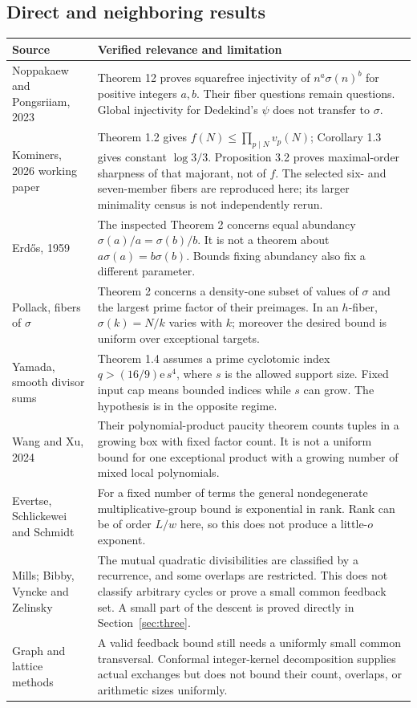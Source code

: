 \documentclass[11pt,a4paper]{article}
\theoremstyle{remark}
\begin{document}
\subsection{Direct and neighboring results}
\begin{longtable}{@{}P{.25\textwidth}P{.69\textwidth}@{}}
\toprule
Source & Verified relevance and limitation\\
\midrule\endhead
Noppakaew and Pongsriiam, 2023 \cite{np} &
Theorem 12 proves squarefree injectivity of $n^a\sigma(n)^b$ for positive
integers $a,b$. Their fiber questions remain questions. Global injectivity for
Dedekind's $\psi$ does not transfer to $\sigma$.\\[4pt]
Kominers, 2026 working paper \cite{kominers} &
Theorem 1.2 gives $f(N)\le\prod_{p\mid N}v_p(N)$; Corollary 1.3 gives
constant $\log3/3$. Proposition 3.2 proves maximal-order sharpness of that
majorant, not of $f$. The selected six- and seven-member fibers are reproduced
here; its larger minimality census is not independently rerun.\\[4pt]
Erd\H{o}s, 1959 \cite{erdos} &
The inspected Theorem 2 concerns equal abundancy
$\sigma(a)/a=\sigma(b)/b$. It is not a theorem about $a\sigma(a)=b\sigma(b)$.
Bounds fixing abundancy also fix a different parameter.\\[4pt]
Pollack, fibers of $\sigma$ \cite{pollack} &
Theorem 2 concerns a density-one subset of values of $\sigma$ and the largest
prime factor of their preimages. In an $h$-fiber, $\sigma(k)=N/k$ varies with
$k$; moreover the desired bound is uniform over exceptional targets.\\[4pt]
Yamada, smooth divisor sums \cite{yamada} &
Theorem 1.4 assumes a prime cyclotomic index $q>(16/9)\mathrm e\,s^4$, where
$s$ is the allowed support size. Fixed input cap means bounded indices while
$s$ can grow. The hypothesis is in the opposite regime.\\[4pt]
Wang and Xu, 2024 \cite{wx} &
Their polynomial-product paucity theorem counts tuples in a growing box with
fixed factor count. It is not a uniform bound for one exceptional product with
a growing number of mixed local polynomials.\\[4pt]
Evertse, Schlickewei and Schmidt \cite{ess} &
For a fixed number of terms the general nondegenerate multiplicative-group
bound is exponential in rank. Rank can be of order $L/w$ here, so this does
not produce a little-$o$ exponent.\\[4pt]
Mills; Bibby, Vyncke and Zelinsky \cite{mills,bibby} &
The mutual quadratic divisibilities are classified by a recurrence, and some
overlaps are restricted. This does not classify arbitrary cycles or prove a
small common feedback set. A small part of the descent is proved directly in
Section~\ref{sec:three}.\\[4pt]
Graph and lattice methods \cite{richard,graver} &
A valid feedback bound still needs a uniformly small common transversal.
Conformal integer-kernel decomposition supplies actual exchanges but does not
bound their count, overlaps, or arithmetic sizes uniformly.\\
\bottomrule
\end{longtable}
\end{document}
